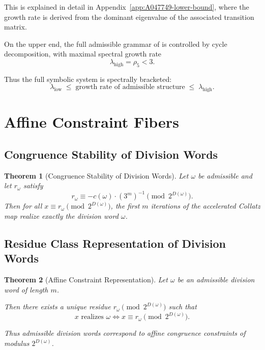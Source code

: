 \documentclass[12pt, oneside]{article}
\numberwithin{equation}{section}
\theoremstyle{definition}
\theoremstyle{plain}
\newtheorem{theorem}{Theorem}[section]
\theoremstyle{remark}
\begin{document}
This is explained in detail in Appendix~\ref{app:A047749-lower-bound}, where the
growth rate is derived from the dominant eigenvalue of the associated transition matrix.

On the upper end, the full admissible grammar of  is controlled by
cycle decomposition, with maximal spectral growth rate
\[
\lambda_{\mathrm{high}} = \rho_5 < 3.
\]

Thus the full symbolic system is spectrally bracketed:
\[
\lambda_{\mathrm{low}} \;\le\; \text{growth rate of admissible structure} \;\le\; \lambda_{\mathrm{high}}.
\]

\section{Affine Constraint Fibers}
\label{sec:affine-constraint-fibers}

\subsection{Congruence Stability of Division Words}

\begin{theorem}[Congruence Stability of Division Words]
Let $\omega$ be admissible and let $r_\omega$ satisfy
\[
r_\omega \equiv -c(\omega)\cdot (3^m)^{-1} \pmod{2^{D(\omega)}}.
\]
Then for all $x \equiv r_\omega \pmod{2^{D(\omega)}}$, the first $m$
iterations of the accelerated Collatz map realize exactly the division word $\omega$.
\end{theorem}

\subsection{Residue Class Representation of Division Words}

\begin{theorem}[Affine Constraint Representation]
Let $\omega$ be an admissible division word of length $m$.

Then there exists a unique residue $r_\omega \pmod{2^{D(\omega)}}$ such that
\[
x \text{ realizes } \omega \iff x \equiv r_\omega \pmod{2^{D(\omega)}}.
\]

Thus admissible division words correspond to affine congruence constraints
of modulus $2^{D(\omega)}$.
\end{theorem}
\end{document}
